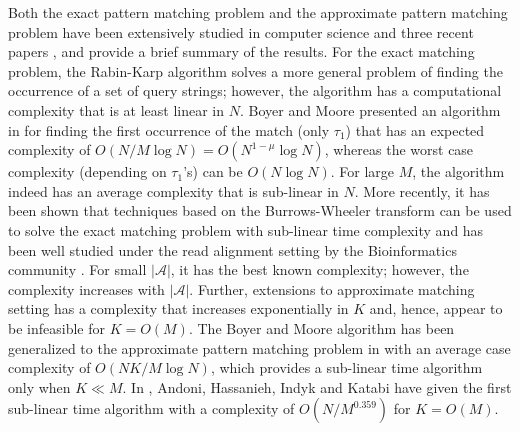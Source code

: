 Both the exact pattern matching problem and the approximate pattern matching problem have been extensively studied in computer science and three recent papers \cite{andoni2013shift}, \cite{amir2004faster} and \cite{navarro2001guided} provide a brief summary of the results. For the exact matching problem, the Rabin-Karp algorithm solves a more general problem of finding the occurrence of a set of query strings; however, the algorithm has a computational complexity that is at least linear in $N$. Boyer and Moore presented an algorithm in \cite{boyer1977fast} for finding the first occurrence of the match (only $\tau_1$) that has an expected complexity of $O(N/M \log N) = O(N^{1-\mu} \log N)$, whereas the worst case complexity (depending on $\tau_1$'s) can be $O(N \log N)$. For large $M$, the algorithm indeed has an average complexity that is sub-linear in $N$. More recently, it has been shown that techniques based on the Burrows-Wheeler transform can be used to solve the exact matching problem with sub-linear time complexity \cite{ferragina2005indexing} and has been well studied under the read alignment setting by the Bioinformatics community \cite{li2009fast,li2010fast}. For small $|\mathcal{A}|$, it has the best known complexity; however, the complexity increases with $|\mathcal{A}|$. Further, extensions to approximate matching setting \cite{zhang2003approximate} has a complexity that increases exponentially in $K$ and, hence, appear to be infeasible for $K = O(M)$. The Boyer and Moore algorithm has been generalized to the approximate pattern matching problem in \cite{chang1994approximate} with an average case complexity of $O(NK/M \log N)$, which provides a sub-linear time algorithm only when $K \ll M$. In \cite{andoni2013shift}, Andoni, Hassanieh, Indyk and Katabi have given the first sub-linear time algorithm with a complexity of $O(N/M^{0.359})$ for $K = O(M)$.

